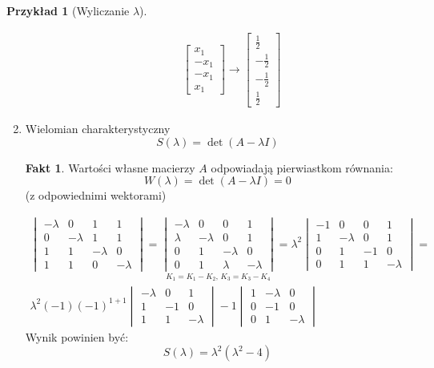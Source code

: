 \documentclass[a4paper,12pt]{article}
\theoremstyle{definition}%
\newtheorem*{fact*}{Fakt} %
\newtheorem{example}{Przykład}
\newtheorem*{example*}{Przykład} %
\theoremstyle{definition}
\theoremstyle{problem}
\begin{document}
\begin{example*}[Wyliczanie $\lambda$]
\begin{enumerate}[label=\Roman*.]
\begin{itemize}
\begin{multicols}{2}
\begin{align*}
&\begin{bmatrix}
x_1\\-x_1\\-x_1\\x_1
\end{bmatrix}\rightarrow
\begin{bmatrix}
\frac{1}{2}\\-\frac{1}{2}\\-\frac{1}{2}\\\frac{1}{2}
\end{bmatrix}
\end{align*}
\end{multicols}
\end{itemize}

\item Wielomian charakterystyczny
$$S(\lambda )=\det (A-\lambda I)$$
\begin{fact*}
Wartości własne macierzy $A$ odpowiadają pierwiastkom równania:
$$W(\lambda )=\det (A-\lambda I)=0$$
(z odpowiednimi wektorami)
\end{fact*}
\begin{align*}
\begin{vmatrix}
-\lambda &0&1&1\\
0&-\lambda &1&1\\
1&1&-\lambda &0\\
1&1&0&-\lambda
\end{vmatrix}=\underset{K_1 = K_1-K_2,\, K_3=K_3-K_4}{\begin{vmatrix}
-\lambda &0&0&1\\
\lambda&-\lambda &0&1\\
0&1&-\lambda &0\\
0&1&\lambda &-\lambda
\end{vmatrix}}=\lambda ^2 \begin{vmatrix}
-1 &0&0&1\\
1&-\lambda &0&1\\
0&1&-1 &0\\
0&1&1 &-\lambda
\end{vmatrix}=\\
\lambda ^2(-1)(-1)^{1+1}\begin{vmatrix}
-\lambda &0 &1\\
1 &-1 & 0 \\
1& 1& -\lambda
\end{vmatrix}-1\begin{vmatrix}
1 &-\lambda &0\\
0 &-1 & 0 \\
0& 1& -\lambda
\end{vmatrix}
\end{align*}
Wynik powinien być: $$S(\lambda )=\lambda ^2 (\lambda ^2 -4)$$
\end{enumerate}
\end{example*}
\end{document}
